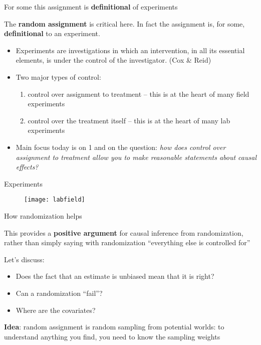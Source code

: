 \documentclass[11pt,ignorenonframetext,]{beamer}
\begin{document}
\begin{frame}{For some this assignment is \textbf{definitional} of
experiments}

The \textbf{random assignment} is critical here. In fact the assignment
is, for some, \textbf{definitional} to an experiment.

\begin{itemize}
    \item Experiments are investigations in which an intervention, in all its essential elements, is under the control of the investigator. (Cox \& Reid)
    \item Two major types of control:
        \begin{enumerate}
            \item control over assignment to treatment -- this is at the heart of many field experiments 
            \item control over the treatment itself -- this is at the heart of many lab experiments
        \end{enumerate}
    \item  Main focus today is on 1 and on the question: \textit{how does control over assignment to treatment allow you to make reasonable statements about causal effects?}
\end{itemize}

\end{frame}

\begin{frame}{Experiments}

\begin{figure}[h]
\centering
\texttt{[image: labfield]}
\end{figure}

\end{frame}

\begin{frame}{How randomization helps}

This provides a \textbf{positive argument }for causal inference from
randomization, rather than simply saying with randomization ``everything
else is controlled for''

\color{red} Let's discuss: \color{black}

\begin{itemize}
    \item Does the fact that an estimate is unbiased mean that it is right?
    \item Can a randomization ``fail''?
    \item Where are the covariates?
\end{itemize}

\color{red} \textbf{Idea}: random assignment is random sampling from
potential worlds: to understand anything you find, you need to know the
sampling weights

\end{frame}
\end{document}
